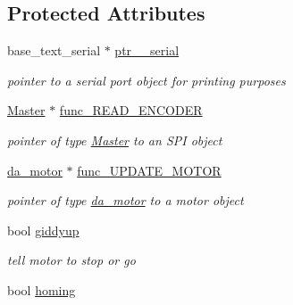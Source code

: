 \subsection*{Protected Attributes}
\begin{DoxyCompactItemize}
\item 
\hypertarget{classtask__PID_abb3ce7591adb11f5dfaf185a60783079}{base\-\_\-text\-\_\-serial $\ast$ \hyperlink{classtask__PID_abb3ce7591adb11f5dfaf185a60783079}{ptr\-\_\-\_\-serial}}\label{classtask__PID_abb3ce7591adb11f5dfaf185a60783079}

\begin{DoxyCompactList}\small\item\em pointer to a serial port object for printing purposes \end{DoxyCompactList}\item 
\hypertarget{classtask__PID_a8ed91ccc6f7ce2161f82911fafd35a2b}{\hyperlink{classMaster}{Master} $\ast$ \hyperlink{classtask__PID_a8ed91ccc6f7ce2161f82911fafd35a2b}{func\-\_\-\-R\-E\-A\-D\-\_\-\-E\-N\-C\-O\-D\-E\-R}}\label{classtask__PID_a8ed91ccc6f7ce2161f82911fafd35a2b}

\begin{DoxyCompactList}\small\item\em pointer of type \hyperlink{classMaster}{Master} to an S\-P\-I object \end{DoxyCompactList}\item 
\hypertarget{classtask__PID_a3b21278136079ae694190e3f620c40cf}{\hyperlink{classda__motor}{da\-\_\-motor} $\ast$ \hyperlink{classtask__PID_a3b21278136079ae694190e3f620c40cf}{func\-\_\-\-U\-P\-D\-A\-T\-E\-\_\-\-M\-O\-T\-O\-R}}\label{classtask__PID_a3b21278136079ae694190e3f620c40cf}

\begin{DoxyCompactList}\small\item\em pointer of type \hyperlink{classda__motor}{da\-\_\-motor} to a motor object \end{DoxyCompactList}\item 
\hypertarget{classtask__PID_a4db9c3da4224504ff3689ad2e16eeeab}{bool \hyperlink{classtask__PID_a4db9c3da4224504ff3689ad2e16eeeab}{giddyup}}\label{classtask__PID_a4db9c3da4224504ff3689ad2e16eeeab}

\begin{DoxyCompactList}\small\item\em tell motor to stop or go \end{DoxyCompactList}\item 
\hypertarget{classtask__PID_a89911b07245fec5c4403f9f781f02788}{bool \hyperlink{classtask__PID_a89911b07245fec5c4403f9f781f02788}{homing}}\label{classtask__PID_a89911b07245fec5c4403f9f781f02788}


\end{DoxyCompactItemize}
